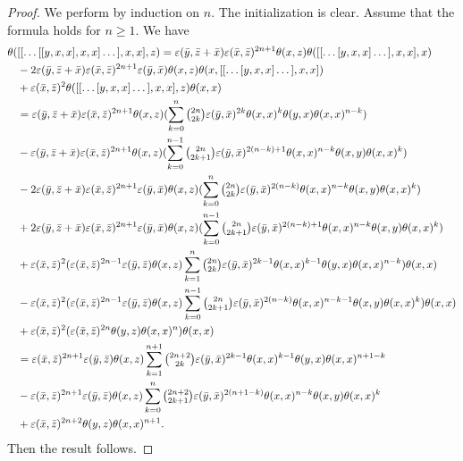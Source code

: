 \documentclass[11pt, twoside]{article}
\begin{document}
\begin{proof}
   We perform by induction on $n$. The initialization is clear. Assume that the formula holds for $n\geq 1$. We have 
    \begin{align*}
        \theta(&[[\dots[[y,x,x],x,x]\dots],x,x],z)= \varepsilon(\bar{y},\bar{z}+\bar{x})\varepsilon(\bar{x},\bar{z})^{2n+1}\theta(x,z)\theta([[\dots[y,x,x]\dots],x,x],x) \\ & -  2\varepsilon(\bar{y},\bar{z}+\bar{x})\varepsilon(\bar{x},\bar{z})^{2n+1}\varepsilon(\bar{y},\bar{x})\theta(x,z)\theta(x,[[\dots[y,x,x]\dots],x,x]) \\ &+\varepsilon(\bar{x},\bar{z})^2\theta([[\dots[y,x,x]\dots],x,x],z)\theta(x,x) \\ & = \varepsilon(\bar{y},\bar{z}+\bar{x})\varepsilon(\bar{x},\bar{z})^{2n+1}\theta(x,z)(\sum\limits_{k=0}^n\tbinom{2n}{2k}\varepsilon(\bar{y},\bar{x})^{2k}\theta(x,x)^k\theta(y,x)\theta(x,x)^{n-k}) \\ & - \varepsilon(\bar{y},\bar{z}+\bar{x})\varepsilon(\bar{x},\bar{z})^{2n+1}\theta(x,z)(\sum\limits_{k=0}^{n-1}\tbinom{2n}{2k+1}\varepsilon(\bar{y},\bar{x})^{2(n-k)+1}\theta(x,x)^{n-k}\theta(x,y)\theta(x,x)^k) \\ & - 2\varepsilon(\bar{y},\bar{z}+\bar{x})\varepsilon(\bar{x},\bar{z})^{2n+1}\varepsilon(\bar{y},\bar{x})\theta(x,z)(\sum\limits_{k=0}^n\tbinom{2n}{2k}\varepsilon(\bar{y},\bar{x})^{2(n-k)}\theta(x,x)^{n-k}\theta(x,y)\theta(x,x)^k)    \\ & +  2\varepsilon(\bar{y},\bar{z}+\bar{x})\varepsilon(\bar{x},\bar{z})^{2n+1}\varepsilon(\bar{y},\bar{x})\theta(x,z)(\sum\limits_{k=0}^{n-1}\tbinom{2n}{2k+1}\varepsilon(\bar{y},\bar{x})^{2(n-k)+1}\theta(x,x)^{n-k}\theta(x,y)\theta(x,x)^k ) \\ & + \varepsilon(\bar{x},\bar{z})^2(\varepsilon(\bar{x},\bar{z})^{2n-1}\varepsilon(\bar{y},\bar{z})\theta(x,z)\sum\limits_{k=1}^n \tbinom{2n}{2k}\varepsilon(\bar{y},\bar{x})^{2k-1}\theta(x,x)^{k-1}\theta(y,x)\theta(x,x)^{n-k})\theta(x,x) \\ &  - \varepsilon(\bar{x},\bar{z})^2(\varepsilon(\bar{x},\bar{z})^{2n-1}\varepsilon(\bar{y},\bar{z})\theta(x,z)\sum\limits_{k=0}^{n-1}\tbinom{2n}{2k+1}\varepsilon(\bar{y},\bar{x})^{2(n-k)}\theta(x,x)^{n-k-1}\theta(x,y)\theta(x,x)^k)\theta(x,x) \\ & + \varepsilon(\bar{x},\bar{z})^2(\varepsilon(\bar{x},\bar{z})^{2n}\theta(y,z)\theta(x,x)^n)\theta(x,x) \\ & =\varepsilon(\bar{x},\bar{z})^{2n+1}\varepsilon(\bar{y},\bar{z})\theta(x,z)\sum\limits_{k=1}^{n+1} \tbinom{2n+2}{2k}\varepsilon(\bar{y},\bar{x})^{2k-1}\theta(x,x)^{k-1}\theta(y,x)\theta(x,x)^{n+1-k} \\ &  - \varepsilon(\bar{x},\bar{z})^{2n+1}\varepsilon(\bar{y},\bar{z})\theta(x,z)\sum\limits_{k=0}^{n}\tbinom{2n+2}{2k+1}\varepsilon(\bar{y},\bar{x})^{2(n+1-k)}\theta(x,x)^{n-k}\theta(x,y)\theta(x,x)^k  \\ & + \varepsilon(\bar{x},\bar{z})^{2n+2}\theta(y,z)\theta(x,x)^{n+1}.
        \end{align*} Then the  result follows.
\end{proof}
\end{document}
